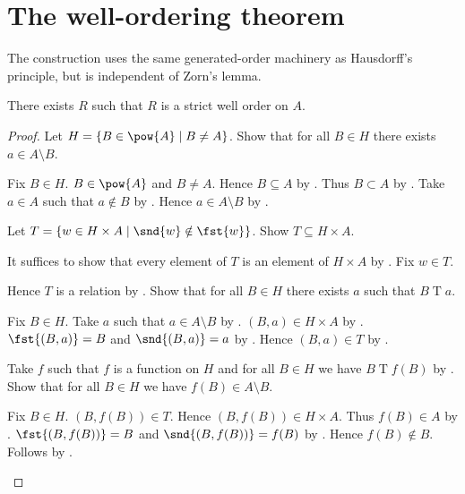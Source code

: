 \section{The well-ordering theorem}




The construction uses the same generated-order machinery as Hausdorff's
principle, but is independent of Zorn's lemma.

\begin{theorem}\label{well_ordering_theorem}
    There exists $R$ such that $R$ is a strict well order on $A$.
\end{theorem}
\begin{proof}
    Let $H=\{B\in\pow{A}\mid B\neq A\}$.
    Show that for all $B\in H$ there exists $a\in A\setminus B$.
    \begin{subproof}
        Fix $B\in H$.
        $B\in\pow{A}$ and $B\neq A$.
        Hence $B\subseteq A$ by .
        Thus $B\subset A$ by .
        Take $a\in A$ such that $a\notin B$ by .
        Hence $a\in A\setminus B$ by .
    \end{subproof}

    Let $T=\{w\in H\times A\mid \snd{w}\notin\fst{w}\}$.
    Show $T\subseteq H\times A$.
    \begin{subproof}
        It suffices to show that every element of $T$ is an element of $H\times A$
            by .
        Fix $w\in T$.
    \end{subproof}
    Hence $T$ is a relation by .
    Show that for all $B\in H$ there exists $a$ such that $B\mathrel{T}a$.
    \begin{subproof}
        Fix $B\in H$.
        Take $a$ such that $a\in A\setminus B$ by \auto.
        $(B,a)\in H\times A$ by .
        $\fst{(B,a)}=B$ and $\snd{(B,a)}=a$ by .
        Hence $(B,a)\in T$ by .
    \end{subproof}
    Take $f$ such that $f$ is a function on $H$ and for all $B\in H$ we have $B\mathrel{T}f(B)$
        by .
    Show that for all $B\in H$ we have $f(B)\in A\setminus B$.
    \begin{subproof}
        Fix $B\in H$.
        $(B,f(B))\in T$.
        Hence $(B,f(B))\in H\times A$.
        Thus $f(B)\in A$ by .
        $\fst{(B,f(B))}=B$ and $\snd{(B,f(B))}=f(B)$ by .
        Hence $f(B)\notin B$.
        Follows by .
    \end{subproof}


\end{proof}
